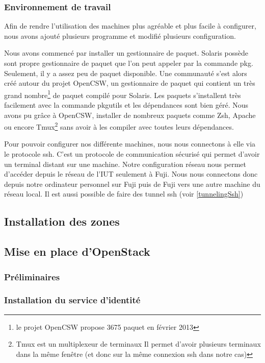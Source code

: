 \documentclass[a4paper,oneside]{report}
\begin{document}
\subsubsection{Environnement de travail}
Afin de rendre l'utilisation des machines plus agréable et plus facile à configurer, nous avons ajouté plusieurs programme et modifié plusieurs configuration.

Nous avons commencé par installer un gestionnaire de paquet.
Solaris possède sont propre gestionnaire de paquet que l'on peut appeler par la commande pkg. Seulement, il y a assez peu de paquet disponible.
Une communauté s'est alors créé autour du projet OpenCSW, un gestionnaire de paquet qui contient un très grand nombre\footnote{le projet OpenCSW propose 3675 paquet en février 2013} de paquet compilé pour Solaris.
Les paquets s'installent très facilement avec la commande pkgutils et les dépendances sont bien géré. Nous avons pu grâce à OpenCSW, installer de nombreux paquets comme Zsh, Apache ou encore Tmux\footnote{Tmux est un multiplexeur de terminaux
Il permet d'avoir plusieurs terminaux dans la même fenêtre (et donc sur la même connexion \gls{ssh} dans notre cas)} sans avoir à les compiler avec toutes leurs dépendances. 

Pour pouvoir configurer nos différente machines, nous nous connectons à elle via le protocole \gls{ssh}. 
C'est un protocole de communication sécurisé qui permet d'avoir un terminal distant sur une machine.
Notre configuration réseau nous permet d'accéder depuis le réseau de l'IUT seulement à Fuji.
Nous nous connectons donc depuis notre ordinateur personnel sur Fuji puis de Fuji vers une autre machine du réseau local.
Il est aussi possible de faire des tunnel \gls{ssh} (voir \ref{tunnelingSsh})

\subsection{Installation des zones}

\subsection{Mise en place d'OpenStack}
\subsubsection{Préliminaires}

\subsubsection{Installation du service d'identité}
\end{document}
